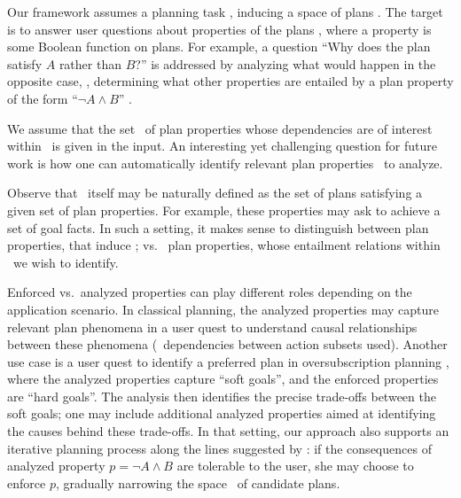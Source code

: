 Our framework assumes a planning task \task, inducing a space of plans
\plans. The target is to answer user questions about properties of the
plans \plans, where a property is some Boolean function on plans. For
example, a question ``Why does the plan satisfy $A$ rather than $B$?''
is addressed by analyzing what would happen in the opposite case, \ie,
determining what other properties are entailed by a plan property of
the form ``$\neg A \wedge B$'' . 

%
We assume that the set \props\ of plan properties whose dependencies
are of interest within \plans\ is given in the input. An interesting
yet challenging question for future work is how one can automatically
identify relevant plan properties \props\ to analyze.

Observe that \plans\ itself may be naturally defined as the set of
plans satisfying a given set of plan properties. For example, these
properties may ask to achieve a set of goal facts. In such a setting,
it makes sense to distinguish between  plan
properties, that induce \plans; vs.\  plan
properties, whose entailment relations within \plans\ we wish to
identify. 

Enforced vs.\ analyzed properties can play different roles depending
on the application scenario. In classical planning, the analyzed
properties may capture relevant plan phenomena in a user quest to
understand causal relationships between these phenomena
(\eg\ dependencies between action subsets used). Another use case is a
user quest to identify a preferred plan in oversubscription planning
\cite{smith:icaps-04,domshlak:mirkis:jair-15}, where the analyzed
properties capture ``soft goals'', and the enforced properties are
``hard goals''. The analysis then identifies the precise trade-offs
between the soft goals; one may include additional analyzed properties
aimed at identifying the causes behind these trade-offs. In that
setting, our approach also supports an iterative planning process
along the lines suggested by \cite{smith:aaai-12}: if the consequences
of analyzed property $p = \neg A \wedge B$ are tolerable to the user,
she may choose to enforce $p$, gradually narrowing the space
\plans\ of candidate plans.


